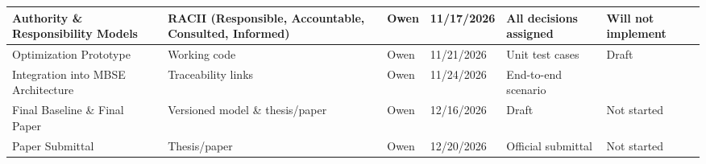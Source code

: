 \begin{table}[htbp]
\begin{tabular}{|p{}|p{}|p{}|p{}|p{}|p{}|}
\hline
Authority \& Responsibility Models & RACII (Responsible, Accountable, Consulted, Informed) & Owen & 11/17/2026 & All decisions assigned & Will not implement \\
\hline
Optimization Prototype & Working code & Owen & 11/21/2026 & Unit test cases & Draft \\
\hline
Integration into MBSE Architecture & Traceability links & Owen & 11/24/2026 & End-to-end scenario & \\
\hline
Final Baseline \& Final Paper & Versioned model \& thesis/paper & Owen & 12/16/2026 & Draft & Not started \\
\hline
Paper Submittal & Thesis/paper & Owen & 12/20/2026 & Official submittal & Not started \\
\hline
\end{tabular}
\end{table}

\FloatBarrier
